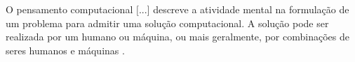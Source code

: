 \begin{citacao}
  O pensamento computacional $[$...$]$ descreve a atividade mental na formulação de um problema para admitir 
uma solução computacional. A solução pode ser realizada por um humano ou máquina, 
ou mais geralmente, por combinações de seres humanos e máquinas \cite[tradução nossa]{Wing2010}.
\end{citacao}










